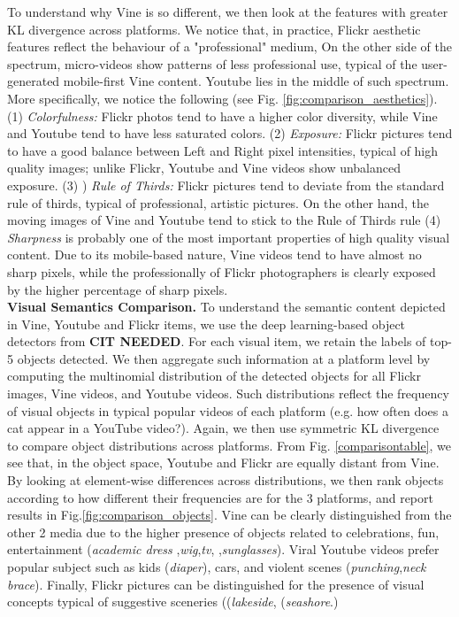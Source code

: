 To understand why Vine is so different, we then look at the features with greater KL divergence across platforms. We notice that, in practice, Flickr aesthetic features reflect the behaviour of a "professional" medium, On the other side of the spectrum, micro-videos show patterns of less professional use, typical  of the  user-generated mobile-first Vine content. Youtube lies in the middle of such spectrum. More specifically, we notice the following (see Fig. \ref{fig:comparison_aesthetics}). (1) \emph{Colorfulness:}  Flickr photos tend to have a higher color diversity, while Vine and Youtube tend to have less saturated colors. (2) \emph{Exposure:}  Flickr pictures tend to have a good balance between Left and Right  pixel intensities, typical of high quality images; unlike Flickr, Youtube and Vine videos show unbalanced exposure. (3) ) \emph{Rule of Thirds:}  Flickr pictures tend to deviate from the standard rule of thirds, typical of professional, artistic pictures. On the other hand, the moving images of Vine and Youtube tend to stick to the Rule of Thirds rule (4) \emph{Sharpness} is probably one of the most important properties of high quality visual content. Due to its mobile-based nature, Vine videos tend to have almost no sharp pixels, while the professionally of Flickr photographers is clearly exposed by the higher percentage of sharp pixels.  
%
\vspace{3pt}\\\textbf{Visual Semantics Comparison.} 
To understand the semantic content depicted in Vine, Youtube and Flickr items, we use the deep learning-based object detectors from \textbf{CIT NEEDED}\cite{}. For each visual item, we retain the labels of top-5 objects detected. We then aggregate such information at a platform level by computing the multinomial distribution of the detected objects for all Flickr images, Vine videos, and Youtube videos.  Such distributions reflect  the frequency of visual objects in typical popular videos of each platform (e.g. how often does a cat appear in a YouTube video?). Again, we then use symmetric KL divergence to compare object distributions across platforms. From Fig. \ref{comparisontable}, we see that, in the object space, Youtube and Flickr are equally distant from Vine. By looking at element-wise differences across distributions, we then rank objects according to how different their frequencies are for the 3 platforms, and report results in Fig.\ref{fig:comparison_objects}. Vine can be clearly distinguished from the other 2 media due to the higher presence of objects related to celebrations, fun, entertainment (\emph{academic dress} ,\emph{wig},\emph{tv}, ,\emph{sunglasses}). Viral Youtube videos prefer popular subject such as kids (\emph{diaper}), cars, and  violent scenes (\emph{punching},\emph{neck brace}). Finally, Flickr pictures can be distinguished for the presence of visual concepts typical of suggestive sceneries ((\emph{lakeside}, (\emph{seashore}.)
